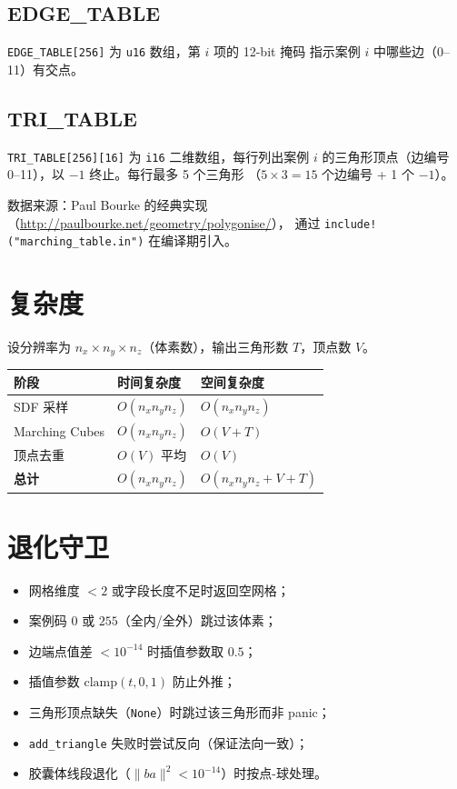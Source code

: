 \documentclass[11pt,a4paper]{article}
\begin{document}
\subsection{EDGE\_TABLE}

\texttt{EDGE\_TABLE[256]} 为 \texttt{u16} 数组，第 $i$ 项的 12-bit 掩码
指示案例 $i$ 中哪些边（0--11）有交点。

\subsection{TRI\_TABLE}

\texttt{TRI\_TABLE[256][16]} 为 \texttt{i16} 二维数组，每行列出案例 $i$
的三角形顶点（边编号 0--11），以 $-1$ 终止。每行最多 5 个三角形
（$5\times 3=15$ 个边编号 + 1 个 $-1$）。

数据来源：Paul Bourke 的经典实现（\url{http://paulbourke.net/geometry/polygonise/}），
通过 \texttt{include!("marching\_table.in")} 在编译期引入。

\section{复杂度}

设分辨率为 $n_x\times n_y\times n_z$（体素数），输出三角形数 $T$，顶点数 $V$。

\begin{center}
\renewcommand{\arraystretch}{1.2}
\begin{tabular}{@{}lll@{}}
  \toprule
  \textbf{阶段} & \textbf{时间复杂度} & \textbf{空间复杂度} \\
  \midrule
  SDF 采样     & $O(n_x n_y n_z)$        & $O(n_x n_y n_z)$ \\
  Marching Cubes & $O(n_x n_y n_z)$      & $O(V+T)$ \\
  顶点去重     & $O(V)$ 平均              & $O(V)$ \\
  \midrule
  \textbf{总计} & $O(n_x n_y n_z)$        & $O(n_x n_y n_z + V + T)$ \\
  \bottomrule
\end{tabular}
\end{center}

\section{退化守卫}

\begin{itemize}
  \item 网格维度 $<2$ 或字段长度不足时返回空网格；
  \item 案例码 $0$ 或 $255$（全内/全外）跳过该体素；
  \item 边端点值差 $<10^{-14}$ 时插值参数取 $0.5$；
  \item 插值参数 $\text{clamp}(t,0,1)$ 防止外推；
  \item 三角形顶点缺失（\texttt{None}）时跳过该三角形而非 panic；
  \item \texttt{add\_triangle} 失败时尝试反向（保证法向一致）；
  \item 胶囊体线段退化（$\|ba\|^2<10^{-14}$）时按点-球处理。
\end{itemize}
\end{document}
